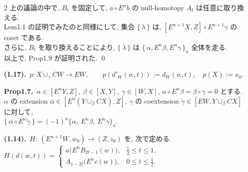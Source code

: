 \documentclass[10pt, leqno]{ltjsarticle}
\newcommand{\Ex}{E}        %
\newcommand{\todai}[2][]{\{\,#2\,\}_{#1}}      %
\newcommand{\gen}[1]{\{\,#1\,\}}       %
\numberwithin{equation}{section}
\theoremstyle{plain}
\theoremstyle{definition}
\theoremstyle{remark}
\begin{document}
\begin{paracol}{2}
上の議論の中で,
\(B_t\)
を固定して,
\(a\circ E^n b\) の null-homotopy \(A_t\) は任意に取り換える.\\
Lem1.1 の証明でみたのと同様にして,
集合 \(\gen{\lambda}\) は,
\([E^{n+1}X, Z]\circ E^{n+1}\gamma\) の coset である.\\
さらに,
\(B_t\) を取り換えることにより,
\(\gen{\lambda}\) は
\(\todai[n]{\alpha, E^n\beta, E^n\gamma}\)
全体を走る.\\
以上で, Prop1.9 が証明された. 
\qed


\switchcolumn

\noindent
\textbf{(1.17).}\
\(p:X\cup_\gamma CW\to EW,\qquad
p(d'_W(w, t)) := d_W(w, t),\quad
p(X) := x_0.\)

\noindent
\textbf{Prop1.7.}\
\(\alpha\in[E^nY, Z],\ \beta\in[X,Y],\ \gamma\in[W,X]\),
$\alpha\circ \Ex^n\beta=\beta\circ\gamma=0$ とする. \\
$\alpha$ の extension $\overline\alpha\in[\Ex^n(Y\cup_\beta CX), Z]$,
$\gamma$ の coextension $\widetilde\gamma\in[EW, Y\cup_\beta CX]$ に対して,\\
\(
\{\ \overline\alpha\circ \Ex^n\widetilde\gamma\ \}
= (-1)^n\{\alpha,\ \Ex^n\beta,\ \Ex^n\gamma\}_n.
\)

\noindent
\textbf{(1.14).}\ 
$H:\ (\Ex^{n+1}W,w_0)\to (Z,z_0)$ を, 次で定める. \\
\(
H(d(w,t))=
\begin{cases}
a\bigl(\Ex^n B_{2t-1}(w)\bigr), & \tfrac12\le t\le 1,\\[2mm]
A_{1-2t}\bigl(\Ex^n c(w)\bigr), & 0\le t\le \tfrac12.
\end{cases}
\)



\end{paracol}

\newpage
\end{document}
